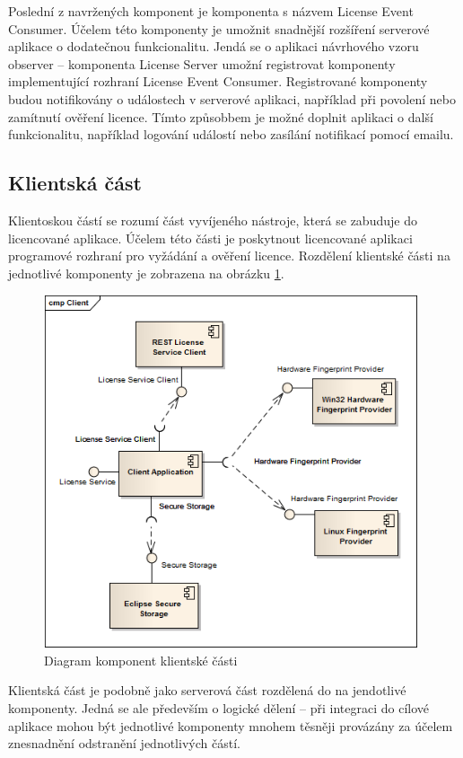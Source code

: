 Poslední z navržených komponent je komponenta s názvem License Event Consumer. 
Účelem této komponenty je umožnit snadnější rozšíření serverové aplikace o
dodatečnou funkcionalitu. Jendá se o aplikaci návrhového vzoru observer –
komponenta License Server umožní registrovat komponenty implementující rozhraní
License Event Consumer. Registrované komponenty budou notifikovány o událostech
v serverové aplikaci, například při povolení nebo zamítnutí ověření licence.
Tímto způsobbem je možné doplnit aplikaci o další funkcionalitu, například
logování událostí nebo zasílání notifikací pomocí emailu.


\subsection{Klientská část}

Klientoskou částí se rozumí část vyvíjeného nástroje, která se zabuduje do
licencované aplikace. Účelem této části je poskytnout licencované aplikaci
programové rozhraní pro vyžádání a ověření licence. Rozdělení klientské části na
jednotlivé komponenty je zobrazena na obrázku \ref{fig:components-client}.

\begin{figure}[tbh]
\begin{center}
\includegraphics[width=11cm]{figures/components-client.png}
\caption{Diagram komponent klientské části}
\label{fig:components-client} 
\end{center}
\end{figure}

Klientská část je podobně jako serverová část rozdělená do na jendotlivé
komponenty. Jedná se ale především o logické dělení – při integraci do cílové
aplikace mohou být jednotlivé komponenty mnohem těsněji provázány za účelem
znesnadnění odstranění jednotlivých částí.

